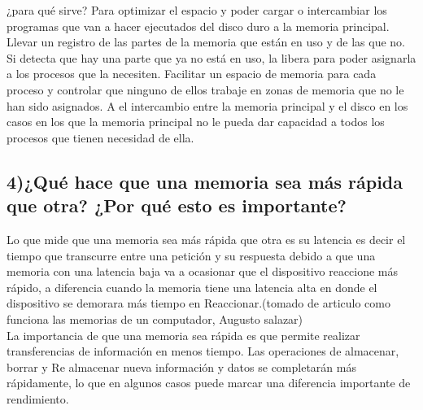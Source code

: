 \documentclass{article}
\begin{document}
¿para qué sirve?
Para optimizar el espacio y poder cargar o intercambiar los programas que van a hacer ejecutados del disco duro a la memoria principal. Llevar un registro de las partes de la memoria que están en uso y de las que no. Si detecta que hay una parte que ya no está en uso, la libera para poder asignarla a los procesos que la necesiten. Facilitar un espacio de memoria para cada proceso y controlar que ninguno de ellos trabaje en zonas de memoria que no le han sido asignados. A el intercambio entre la memoria principal y el disco en los casos en los que la memoria principal no le pueda dar capacidad a todos los procesos que tienen necesidad de ella.\\[0.1cm]


\subsection*{4)¿Qué hace que una memoria sea más rápida que otra? ¿Por qué esto es importante?}

Lo que mide que una memoria sea más rápida que otra es su latencia es decir el tiempo que transcurre entre una petición y su respuesta debido a que una memoria con una latencia baja va a ocasionar que el dispositivo reaccione más rápido, a diferencia cuando la memoria tiene una latencia alta en donde el dispositivo se demorara más tiempo en Reaccionar.(tomado de articulo como funciona las memorias de un computador, Augusto salazar)\\[0.1cm]

La importancia de que una memoria sea rápida es que permite realizar transferencias de información en menos tiempo. Las operaciones de almacenar, borrar y Re almacenar nueva información y datos se completarán más rápidamente, lo que en algunos casos puede marcar una diferencia importante de rendimiento.



\end{document}
